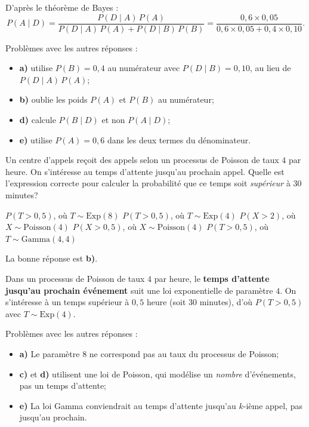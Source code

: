 \begin{questions}
\begin{solution}
D'après le théorème de Bayes :
$$P(A\mid D)=\frac{P(D\mid A)\,P(A)}{P(D\mid A)\,P(A)+P(D\mid B)\,P(B)}=\frac{0{,}6\times 0{,}05}{0{,}6\times 0{,}05+0{,}4\times 0{,}10}.$$

Problèmes avec les autres réponses :
\begin{itemize}
\item \textbf{a)} utilise $P(B)=0{,}4$ au numérateur avec $P(D\mid B)=0{,}10$, au lieu de $P(D\mid A)\,P(A)$;
\item \textbf{b)} oublie les poids $P(A)$ et $P(B)$ au numérateur;
\item \textbf{d)} calcule $P(B\mid D)$ et non $P(A\mid D)$;
\item \textbf{e)} utilise $P(A)=0{,}6$ dans les deux termes du dénominateur.
\end{itemize}
\end{solution}

\vspace{0.2in}

\question[3]
Un centre d'appels reçoit des appels selon un processus de Poisson de taux $4$ par heure. On s'intéresse au temps d'attente jusqu'au prochain appel. Quelle est l'expression correcte pour calculer la probabilité que ce temps soit \emph{supérieur} à $30$ minutes?\\

\begin{checkboxes}
\choice $P(T>0{,}5)$, où $T\sim \mathrm{Exp}(8)$
\correctchoice $P(T>0{,}5)$, où $T\sim \mathrm{Exp}(4)$
\choice $P(X>2)$, où $X\sim \mathrm{Poisson}(4)$
\choice $P(X>0{,}5)$, où $X\sim \mathrm{Poisson}(4)$
\choice $P(T>0{,}5)$, où $T\sim \mathrm{Gamma}(4,4)$
\end{checkboxes}

\begin{solution}
La bonne réponse est \textbf{b)}.

Dans un processus de Poisson de taux $4$ par heure, le \textbf{temps d'attente jusqu'au prochain événement} suit une loi exponentielle de paramètre $4$. On s'intéresse à un temps supérieur à $0{,}5$ heure (soit 30 minutes), d'où $P(T>0{,}5)$ avec $T\sim\mathrm{Exp}(4)$.

Problèmes avec les autres réponses :
\begin{itemize}
\item \textbf{a)} Le paramètre $8$ ne correspond pas au taux du processus de Poisson;
\item \textbf{c)} et \textbf{d)} utilisent une loi de Poisson, qui modélise un \emph{nombre} d'événements, pas un temps d'attente;
\item \textbf{e)} La loi Gamma conviendrait au temps d'attente jusqu'au $k$-ième appel, pas jusqu'au prochain.
\end{itemize}
\end{solution}


\end{questions}
